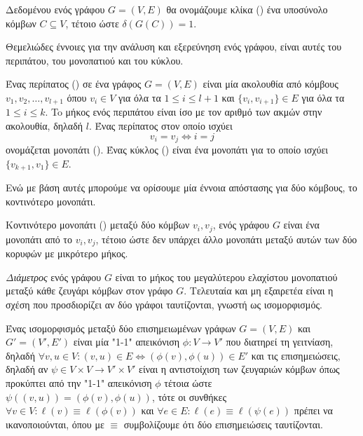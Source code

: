\begin{definition}[Κλίκα]
Δεδομένου ενός γράφου $G = ( V, E )$ θα ονομάζουμε κλίκα () ένα υποσύνολο κόμβων $C \subseteq V$, τέτοιο ώστε $\delta(G(C)) = 1$.
\end{definition}
Θεμελιώδες έννοιες για την ανάλυση και εξερεύνηση ενός γράφου, είναι αυτές του περιπάτου, του μονοπατιού και του κύκλου.
\begin{definition}
Ένας περίπατος () σε ένα γράφος $G = (V, E)$ είναι μία ακολουθία από κόμβους $v_{1}, v_{2}, \dots , v_{l + 1}$ όπου $v_{i} \in V$ για όλα τα $1 \leq i \leq l + 1$ και $\{ v_{i} , v_{i + 1} \} \in E$ για όλα τα
$1 \leq i \leq k$. To μήκος ενός περιπάτου είναι ίσο με τον αριθμό των ακμών στην ακολουθία, δηλαδή $l$.
Ένας περίπατος στον οποίο ισχύει $$v_{i} = v_{j} \Leftrightarrow i = j$$ ονομάζεται μονοπάτι ().
Ένας κύκλος () είναι ένα μονοπάτι για το οποίο ισχύει $\{v_{k + 1}, v_{1}\} \in E$.
\label{def:path}
\end{definition}
Ενώ με βάση αυτές μπορούμε να ορίσουμε μία έννοια απόστασης για δύο κόμβους, το κοντινότερο μονοπάτι.
\begin{definition}
Κοντινότερο μονοπάτι () μεταξύ δύο κόμβων $v_{i}, v_{j}$, ενός γράφου $G$ είναι ένα μονοπάτι από
το $v_{i}, v_{j}$, τέτοιο ώστε δεν υπάρχει άλλο μονοπάτι μεταξύ αυτών των δύο κορυφών με μικρότερο μήκος.
\end{definition}
\textit{Διάμετρος} ενός γράφου $G$ είναι το μήκος του μεγαλύτερου ελαχίστου μονοπατιού μεταξύ κάθε ζευγάρι κόμβων στον γράφο $G$.
Τελευταία και μη εξαιρετέα είναι η σχέση που προσδιορίζει αν δύο γράφοι ταυτίζονται, γνωστή ως ισομορφισμός.
\begin{definition}[Ισομορφισμός]
Ένας ισομορφισμός μεταξύ δύο επισημειωμένων γράφων $G=(V,E)$ και $G'=(V',E')$ είναι μία "1-1" απεικόνιση $\phi : V \rightarrow V'$ που διατηρεί τη γειτνίαση, δηλαδή $\forall v,u \in V : (v,u) \in E \Leftrightarrow (\phi(v), \phi(u)) \in E'$ και τις επισημειώσεις, δηλαδή αν $\psi \in V \times V \rightarrow V' \times V'$ είναι η αντιστοίχιση των ζευγαριών κόμβων όπως προκύπτει από την "1-1" απεικόνιση $\phi$ τέτοια ώστε $\psi((v,u)) = (\phi(v), \phi(u))$, τότε οι συνθήκες $\forall v \in V : \ell(v) \equiv \ell(\phi(v))$ και $\forall e \in E : \ell(e) \equiv \ell(\psi(e))$ πρέπει να ικανοποιούνται, όπου με $\equiv$ συμβολίζουμε ότι δύο επισημειώσεις ταυτίζονται.
\label{def:isomorphism}
\end{definition}
